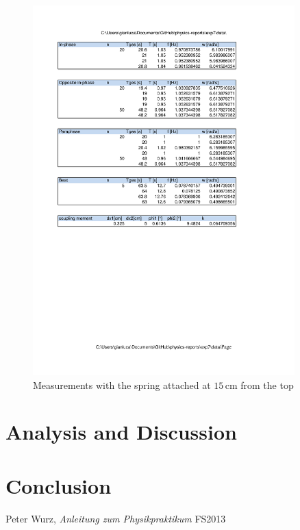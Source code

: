 \documentclass{scrreprt}
\newcommand{\unit}[1]{\ensuremath{\, \mathrm{#1}}}
\begin{document}
\begin{figure}[H]
	\centering
  \includegraphics[width=0.9\textwidth]{diag/readings15cm.pdf}
	\caption{Measurements with the spring attached at $15\unit{cm}$ from the top}
	\label{fig:15cm}
\end{figure}


\section{Analysis and Discussion}

\section{Conclusion}

\begin{thebibliography}{9}

  Peter Wurz,
  \emph{Anleitung zum Physikpraktikum}
  FS2013

\end{thebibliography}
\end{document}
